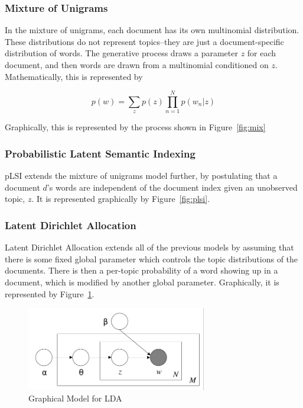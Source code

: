 \documentclass{article}
\begin{document}
\subsubsection{Mixture of Unigrams}

In the mixture of unigrams, each document has its own multinomial distribution.
These distributions do not represent topics--they are just a document-specific distribution of
words. The generative process draws a parameter $z$ for each document, and then
words are drawn from a multinomial conditioned on $z$. Mathematically, this is
represented by

\[
  p(w) = \sum_z p(z) \prod\limits_{n=1}^N p(w_n | z)
\]

Graphically, this is represented by the process shown in Figure~\ref{fig:mix}

\subsubsection{Probabilistic Latent Semantic Indexing}

pLSI extends the mixture of unigrams model further, by postulating that a
document $d$'s words are independent of the document index given an unobserved
topic, $z$. It is represented graphically by Figure~\ref{fig:plsi}.

\subsubsection{Latent Dirichlet Allocation}

Latent Dirichlet Allocation extends all of the previous models by assuming that
there is some fixed global parameter which controls the topic distributions of
the documents. There is then a per-topic probability of a word showing up in a
document, which is modified by another global parameter. Graphically, it is
represented by Figure~\ref{fig:ldagraph}.

\begin{figure}
  \centering
  \includegraphics[width=0.7\textwidth]{lda}
  \caption{Graphical Model for LDA}
  \label{fig:ldagraph}
\end{figure}
\end{document}

